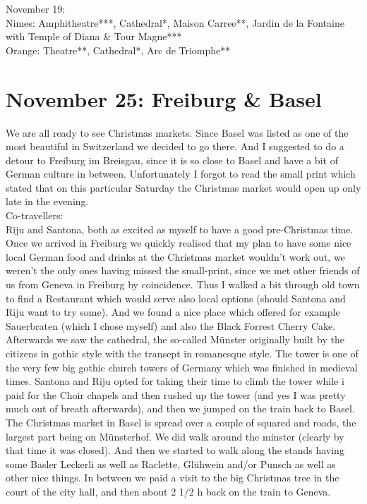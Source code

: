 November 19:\\
Nimes: Amphitheatre***, Cathedral*, Maison Carree**, Jardin de la Fontaine with Temple of Diana \& Tour Magne***\\
Orange: Theatre**, Cathedral*, Arc de Triomphe**

\section{November 25: Freiburg \& Basel}
\label{Freiburg2018}

We are all ready to see Christmas markets. Since Basel was listed as one of the most beautiful in Switzerland we decided to go there. And I suggested to do a detour to Freiburg im Breisgau, since it is so close to Basel and have a bit of German culture in between. Unfortunately I forgot to read the small print which stated that on this particular Saturday the Christmas market would open up only late in the evening.\\

Co-travellers:\\
Riju and Santona, both as excited as myself to have a good pre-Christmas time.\\

Once we arrived in Freiburg we quickly realised that my plan to have some nice local German food and drinks at the Christmas market wouldn't work out, we weren't the only ones having missed the small-print, since we met other friends of us from Geneva in Freiburg by coincidence. Thus I walked a bit through old town to find a Restaurant which would serve also local options (should Santona and Riju want to try some). And we found a nice place which offered for example Sauerbraten (which I chose myself) and also the Black Forrest Cherry Cake. Afterwards we saw the cathedral, the so-called M\"unster originally built by the citizens in gothic style with the transept in romanesque style. The tower is one of the very few big gothic church towers of Germany which was finished in medieval times. Santona and Riju opted for taking their time to climb the tower while i paid for the Choir chapels and then rushed up the tower (and yes I was pretty much out of breath afterwards), and then we jumped on the train back to Basel. The Christmas market in Basel is spread over a couple of squared and roads, the largest part being on M\"unsterhof. We did walk around the minster (clearly by that time it was closed). And then we started to walk along the stands having some Basler Leckerli as well as Raclette, Gl\"uhwein and/or Punsch as well as other nice things. In between we paid a visit to the big Christmas tree in the court of the city hall, and then about 2 1/2 h back on the train to Geneva.\\

